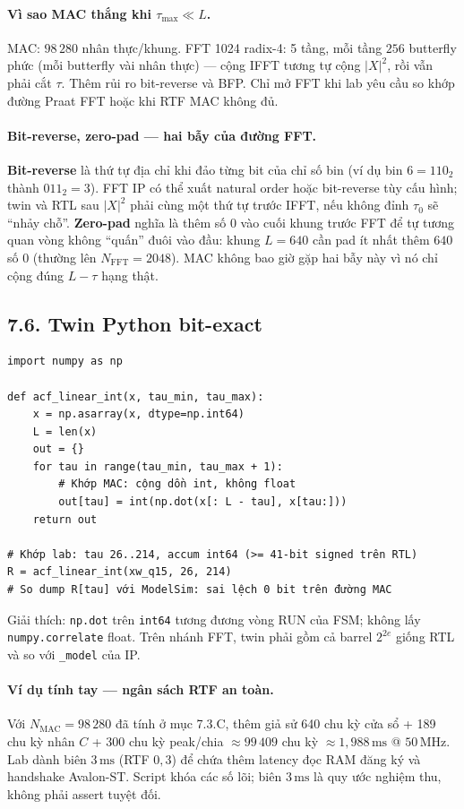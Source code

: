 \paragraph{Vì sao MAC thắng khi $\tau_{\max}\ll L$.}
MAC: $98\,280$ nhân thực/khung. FFT 1024 radix-4: 5 tầng, mỗi tầng $256$ butterfly phức (mỗi butterfly vài nhân thực) --- cộng IFFT tương tự cộng $|X|^2$, rồi vẫn phải cắt $\tau$. Thêm rủi ro bit-reverse và BFP. Chỉ mở FFT khi lab yêu cầu so khớp đường Praat FFT hoặc khi RTF MAC không đủ.


\paragraph{Bit-reverse, zero-pad --- hai bẫy của đường FFT.}
\textbf{Bit-reverse} là thứ tự địa chỉ khi đảo từng bit của chỉ số bin (ví dụ bin $6=110_2$ thành $011_2=3$). FFT IP có thể xuất natural order hoặc bit-reverse tùy cấu hình; twin và RTL sau $|X|^2$ phải cùng một thứ tự trước IFFT, nếu không đỉnh $\tau_0$ sẽ ``nhảy chỗ''. \textbf{Zero-pad} nghĩa là thêm số 0 vào cuối khung trước FFT để tự tương quan vòng không ``quấn'' đuôi vào đầu: khung $L=640$ cần pad ít nhất thêm $640$ số 0 (thường lên $N_{\mathrm{FFT}}=2048$). MAC không bao giờ gặp hai bẫy này vì nó chỉ cộng đúng $L-\tau$ hạng thật.

\subsection*{7.6. Twin Python bit-exact}

\begin{verbatim}
import numpy as np

def acf_linear_int(x, tau_min, tau_max):
    x = np.asarray(x, dtype=np.int64)
    L = len(x)
    out = {}
    for tau in range(tau_min, tau_max + 1):
        # Khớp MAC: cộng dồn int, không float
        out[tau] = int(np.dot(x[: L - tau], x[tau:]))
    return out

# Khớp lab: tau 26..214, accum int64 (>= 41-bit signed trên RTL)
R = acf_linear_int(xw_q15, 26, 214)
# So dump R[tau] với ModelSim: sai lệch 0 bit trên đường MAC
\end{verbatim}
Giải thích: \texttt{np.dot} trên \texttt{int64} tương đương vòng RUN của FSM; không lấy \texttt{numpy.correlate} float. Trên nhánh FFT, twin phải gồm cả barrel $2^{2e}$ giống RTL và so với \texttt{\_model} của IP.

\paragraph{Ví dụ tính tay --- ngân sách RTF an toàn.}
Với $N_{\mathrm{MAC}}=98\,280$ đã tính ở mục 7.3.C, thêm giả sử 640 chu kỳ cửa sổ + 189 chu kỳ nhân $C$ + 300 chu kỳ peak/chia $\approx 99\,409$ chu kỳ $\approx 1{,}988\,\text{ms}$ @ $50\,\text{MHz}$. Lab dành biên $3\,\text{ms}$ (RTF $0{,}3$) để chứa thêm latency đọc RAM đăng ký và handshake Avalon-ST. Script khóa các số lõi; biên $3\,\text{ms}$ là quy ước nghiệm thu, không phải assert tuyệt đối.

